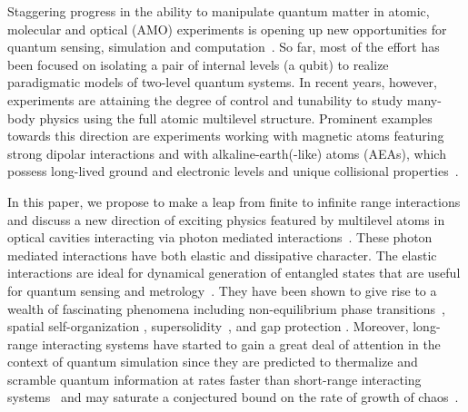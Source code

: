 \documentclass[aps,prx,superscriptaddress,twocolumn,notitlepage,nofootinbib,longbibliography]{revtex4-2}
\begin{document}
Staggering progress in the ability to manipulate quantum matter in  atomic,  molecular and optical (AMO) experiments is opening up new opportunities for  quantum sensing, simulation and computation~\cite{Gross2017}. So far, most of the   effort has been focused on isolating a  pair  of internal levels  (a qubit)  to realize  paradigmatic models of  two-level quantum systems.  In recent years, however, experiments are attaining the degree of control and tunability to study many-body physics using the  full atomic multilevel structure. Prominent examples towards this direction are experiments working with  magnetic atoms \cite{lepoutre2019,depaz2013,patscheider2020,Burdick2016} featuring strong dipolar interactions and with alkaline-earth(-like)  atoms (AEAs), which possess long-lived ground and electronic levels and unique collisional properties~\cite{Gorshkov2010, Cazalilla2014, Takahashi2020, Cazalilla2009,Wu2003}.

In this paper, we propose to  make a leap from finite to infinite range interactions and discuss a new direction of exciting physics featured by   multilevel atoms in optical cavities interacting via photon mediated interactions~\cite{VuleticBlack_PRL2003, SchoelkopfMajer_Nature2007, VuleticLeroux_PRL2010, WallraffScience2013, ReichelBarontini_Science2015, KasevichHosten_Science2016, LevKollar_NatComm2017, DonnerLeonard_Nature2017, ThompsonNorcia_Science2018, LevKroeze_PRL2018, EsslingerLandini_PRL2018, StamperKurnKohler_PRL2018, LevGuo_PRL2019, SchleierSmithDavis_PRL2019, VuleticBraverman_PRL2019, SchleierSmithBorish_PRL2020, SchleierSmithDavis_PRL2020}. These  photon mediated interactions have both elastic and dissipative character. The elastic  interactions are ideal for dynamical generation of  entangled states that are useful for  quantum sensing  and metrology~\cite{VuleticLeroux_PRL2010, ReichelBarontini_Science2015, KasevichHosten_Science2016, VuleticBraverman_PRL2019}. They  have been shown to   give rise to a wealth of fascinating phenomena including non-equilibrium phase transitions~\cite{DallaTorre_AdvQTech2, BarrettBaden_PRL2014, BarrettZhiqiang_OSA2017, BarrettZhang_PRA97, ThompsonMuniz_Arxiv2019}, spatial self-organization \cite{VuleticBlack_PRL2003, EsslingerBaumann_Nature2010, EsslingerBaumann_PRL2011, HemmerichKlinder_PRL115, HemmerichKlinder_PNAS2015, LevKroeze_PRL2018, LevVaidya_PRX8, EsslingerLandini_PRL2018, LevGuo_PRL2019}, supersolidity~\cite{DonnerLeonard_Nature2017,Zimmermann_PRL2020}, and  gap protection \cite{ SchleierSmithDavis_PRL2020, ThompsonNorcia_Science2018}. Moreover,  long-range interacting systems have started to gain a great deal of attention in the context of quantum simulation since they are predicted  to thermalize and scramble quantum information at rates faster than short-range interacting systems~\cite{Sachdev1993, Kitaev} and may saturate  a conjectured bound on the rate of growth of chaos~\cite{Maldacena2016}. 
\end{document}
